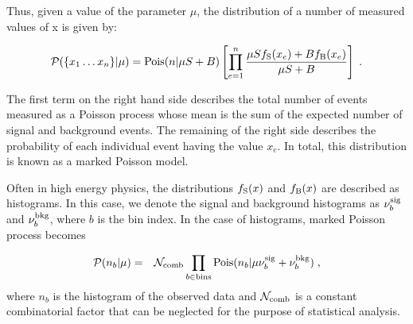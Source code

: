 Thus, given a value of the parameter $\mu$, the distribution of a number of measured values of x is given by:

\begin{eqnarray}
{\cal P}(\{x_1\dots x_n\} | \mu) = \textrm{Pois}(n | \mu S+B) \left[ \prod_{e=1}^n \frac{\mu S f_{\rm S}(x_e) + B f_{\rm B}(x_e)}{\mu S+B}\right ] \; .
\end{eqnarray}

The first term on the right hand side describes the total number of events measured as a Poisson process whose mean is the sum of the expected number of signal and background events.
The remaining of the right side describes the probability of each individual event having the value $x_e$.
In total, this distribution is known as a marked Poisson model.

Often in high energy physics, the distributions $f_{\rm S}(x)$ and $f_{\rm B}(x)$ are described as histograms.
In this case, we denote the signal and background histograms as $\nu_b^{\rm sig}$ and $\nu_b^{\rm bkg}$, where $b$ is the bin index.
In the case of histograms,  marked Poisson process becomes

\begin{eqnarray}
{\cal P}(n_b |\mu) &=& \mathcal{N}_{\rm comb} \prod_{b\in\rm bins} \textrm{Pois}(n_b | \mu \nu_{b}^{\rm sig} + \nu_{b}^{\rm bkg}) \; ,
\label{eqn:histpois}
\end{eqnarray}
where $n_b$ is the histogram of the observed data and $\mathcal{N}_{\rm comb}$ is a constant combinatorial factor that can be neglected for the purpose of statistical analysis.   


